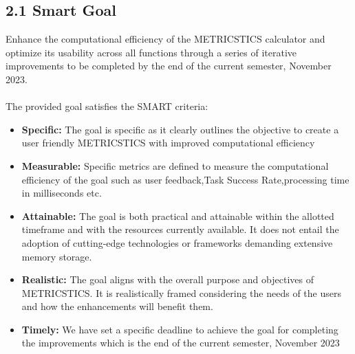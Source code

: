 \subsection{2.1 Smart Goal}
\vspace{10pt}
\normalsize{Enhance the computational efficiency of the METRICSTICS calculator and optimize its usability across all functions through a series of iterative improvements to be completed by the end of the current semester, November 2023. }\\
\\The provided goal satisfies the SMART criteria:
\begin{itemize}
\item \textbf{Specific:} The goal is specific as it clearly outlines the objective to create a user friendly METRICSTICS with improved computational efficiency
\item \textbf{Measurable:} Specific metrics are defined to measure the computational efficiency of the goal such as user feedback,Task Success Rate,processing time in milliseconds etc. 
\item \textbf{Attainable:} The goal is both practical and attainable within the allotted timeframe and with the resources currently available. It does not entail the adoption of cutting-edge technologies or frameworks demanding extensive memory storage.
\item \textbf{Realistic:} The goal aligns with the overall purpose and objectives of METRICSTICS. It is realistically framed considering the needs of the users and how the enhancements will benefit them.
\item \textbf{Timely:} We have set a specific deadline to achieve the goal for completing the improvements which is the end of the current semester, November 2023
\end{itemize}

